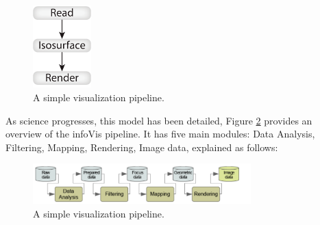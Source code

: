 \begin{figure}[h!]
  \center
  \includegraphics[width=0.20\textwidth]{images/chapter2/simplepipline.PNG}
  \caption{A simple visualization pipeline.}
  \label{fig:simplepipeline}
\end{figure}

\bigbreak
As science progresses, this model has been detailed, Figure \ref{fig:infovispipeline} provides an overview of the infoVis pipeline. It has five main modules: Data Analysis, Filtering, Mapping, Rendering, Image data, explained as follows:


\begin{figure}[h!]
  \center
  \includegraphics[width=0.75\textwidth]{images/chapter2/infoVispipeline.PNG}
  \caption{A simple visualization pipeline.}
  \label{fig:infovispipeline}
\end{figure}



